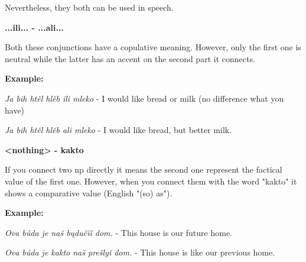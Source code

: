 Nevertheless, they both can be used in speech.

\textbf{...ili... - ...ali...}

Both these conjunctions have a copulative meaning. However, only the first one is neutral while the latter has an accent on the second part it connects.

\textbf{Example:}

\textit{Ja bih htěl hlěb ili mleko} - I would like bread or milk (no difference what you have)

\textit{Ja bih htěl hlěb ali mleko} - I would like bread, but better milk.

\textbf{<nothing> - kakto}

If you connect two \gls{np} directly it means the second one represent the factical value of the first one. However, when you connect them with the word "kakto" it shows a comparative value (English "(so) as").

\textbf{Example:}

\textit{Ova búda je naš bųdučïǐ dom.} - This house is our future home.

\textit{Ova búda je kakto naš prešlyǐ dom.} - This house is like our previous home.